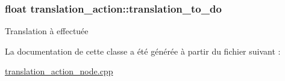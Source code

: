 \subsubsection[{\texorpdfstring{translation\+\_\+to\+\_\+do}{translation_to_do}}]{\setlength{\rightskip}{0pt plus 5cm}float translation\+\_\+action\+::translation\+\_\+to\+\_\+do\hspace{0.3cm}{\ttfamily [private]}}\hypertarget{classtranslation__action_a5811a9d811697668e153543dfaf1d2d0}{}\label{classtranslation__action_a5811a9d811697668e153543dfaf1d2d0}
Translation à effectuée 

La documentation de cette classe a été générée à partir du fichier suivant \+:\begin{DoxyCompactItemize}
\item 
\hyperlink{translation__action__node_8cpp}{translation\+\_\+action\+\_\+node.\+cpp}\end{DoxyCompactItemize}

